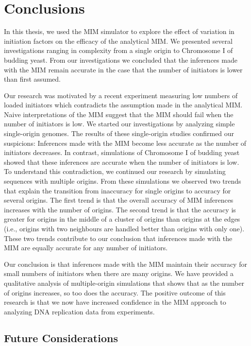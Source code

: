 \chapter{Conclusions}
\label{ch:Conclusions}

In this thesis, we used the MIM simulator to explore the effect of variation in initiation factors on the efficacy of the analytical MIM.
We presented several investigations ranging in complexity from a single origin to Chromosome I of budding yeast.
From our investigations we concluded that the inferences made with the MIM remain accurate in the case that the number of initiators is lower than first assumed.

Our research was motivated by a recent experiment measuring low numbers of loaded initiators which contradicts the assumption made in the analytical MIM.
Naive interpretations of the MIM suggest that the MIM should fail when the number of initiators is low.
We started our investigations by analyzing simple single-origin genomes.
The results of these single-origin studies confirmed our suspicions:
Inferences made with the MIM become less accurate as the number of initiators decreases.
In contrast, simulations of Chromosome I of budding yeast showed that these inferences are accurate when the number of initiators is low.
To understand this contradiction, we continued our research by simulating sequences with multiple origins.
From these simulations we observed two trends that explain the transition from inaccuracy for single origins to accuracy for several origins.
The first trend is that the overall accuracy of MIM inferences increases with the number of origins.
The second trend is that the accuracy is greater for origins in the middle of a cluster of origins than origins at the edges (i.e., origins with two neighbours are handled better than origins with only one).
These two trends contribute to our conclusion that inferences made with the MIM are equally accurate for any number of initiators.

Our conclusion is that inferences made with the MIM maintain their accuracy for small numbers of initiators when there are many origins.
We have provided a qualitative analysis of multiple-origin simulations that shows that as the number of origins increases, so too does the accuracy.
The positive outcome of this research is that we now have increased confidence in the MIM approach to analyzing DNA replication data from experiments.

	\section{Future Considerations}
	
